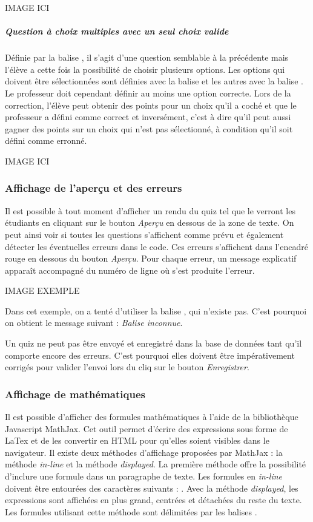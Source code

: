 \documentclass[a4,10pt,french]{sphinxmanual}
\begin{document}
IMAGE ICI


\subparagraph{Question à choix multiples avec un seul choix valide}
\label{doc-user:id1}
Définie par la balise \code{\#\#}, il s'agit d'une question semblable à la précédente mais l'élève a cette fois la possibilité de choisir plusieurs options. Les options qui doivent être sélectionnées sont définies avec la balise \code{=} et les autres avec la balise \code{*}. Le professeur doit cependant définir au moins une option correcte. Lors de la correction, l'élève peut obtenir des points pour un choix qu'il a coché et que le professeur a défini comme correct et inversément, c'est à dire qu'il peut aussi gagner des points sur un choix qui n'est pas sélectionné, à condition qu'il soit défini comme erronné.

IMAGE ICI


\subsubsection{Affichage de l'aperçu et des erreurs}
\label{doc-user:affichage-de-l-apercu-et-des-erreurs}
Il est possible à tout moment d'afficher un rendu du quiz tel que le verront les étudiants en cliquant sur le bouton \emph{Aperçu} en dessous de la zone de texte. On peut ainsi voir si toutes les questions s'affichent comme prévu et également détecter les éventuelles erreurs dans le code. Ces erreurs s'affichent dans l'encadré rouge en dessous du bouton \emph{Aperçu}. Pour chaque erreur, un message explicatif apparaît accompagné du numéro de ligne où s'est produite l'erreur.

IMAGE EXEMPLE

Dans cet exemple, on a tenté d'utiliser la balise \code{*=}, qui n'existe pas. C'est pourquoi on obtient le message suivant : \emph{Balise inconnue}.

Un quiz ne peut pas être envoyé et enregistré dans la base de données tant qu'il comporte encore des erreurs. C'est pourquoi elles doivent être impérativement corrigés pour valider l'envoi lors du cliq sur le bouton \emph{Enregistrer}.


\subsubsection{Affichage de mathématiques}
\label{doc-user:affichage-de-mathematiques}
Il est possible d'afficher des formules mathématiques à l'aide de la bibliothèque Javascript MathJax. Cet outil permet d'écrire des expressions sous forme de LaTex et de les convertir en HTML pour qu'elles soient visibles dans le navigateur. Il existe deux méthodes d'affichage proposées par MathJax : la méthode \emph{in-line} et la méthode \emph{displayed}. La première méthode offre la possibilité d'inclure une formule dans un paragraphe de texte. Les formules en \emph{in-line} doivent être entourées des caractères suivants : . Avec la méthode \emph{displayed}, les expressions sont affichées en plus grand, centrées et détachées du reste du texte. Les formules utilisant cette méthode sont délimitées par les balises .
\end{document}
